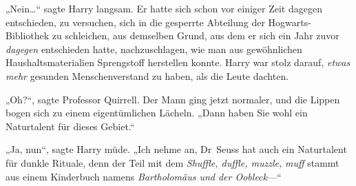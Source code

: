 {„Nein…“ sagte Harry langsam. Er hatte sich schon vor einiger Zeit dagegen entschieden, zu versuchen, sich in die gesperrte Abteilung der Hogwarts-Bibliothek zu schleichen, aus demselben Grund, aus dem er sich ein Jahr zuvor \emph{dagegen} entschieden hatte, nachzuschlagen, wie man aus gewöhnlichen Haushaltsmaterialien Sprengstoff herstellen konnte. Harry war stolz darauf, \emph{etwas} \emph{mehr} gesunden Menschenverstand zu haben, als die Leute dachten.

„Oh?“, sagte Professor Quirrell. Der Mann ging jetzt normaler, und die Lippen bogen sich zu einem eigentümlichen Lächeln. „Dann haben Sie wohl ein Naturtalent für dieses Gebiet.“

„Ja, nun“, sagte Harry müde. „Ich nehme an, Dr~Seuss hat auch ein Naturtalent für dunkle Rituale, denn der Teil mit dem \emph{Shuffle, duffle, muzzle,} \emph{muff} stammt aus einem Kinderbuch namens \emph{Bartholomäus und der Oobleck}—“

}
